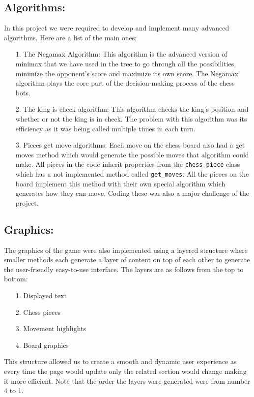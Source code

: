 \documentclass{article}
\begin{document}
\subsection*{Algorithms:}
In this project we were required to develop and implement many advanced algorithms. Here are a list of the main ones:
\begin{enumerate}
    \item[1.] The Negamax Algorithm: This algorithm is the advanced version of minimax that we have used in the tree to go through all the possibilities, minimize the opponent's score and maximize its own score. The Negamax algorithm plays the core part of the decision-making process of the chess bots.
    \item[2.] The king is check algorithm: This algorithm checks the king's position and whether or not the king is in check. The problem with this algorithm was its efficiency as it was being called multiple times in each turn.
    \item[3.] Pieces get move algorithms: Each move on the chess board also had a get moves method which would generate the possible moves that algorithm could make. All pieces in the code inherit properties from the \texttt{chess\_piece} class which has a not implemented method called \texttt{get\_moves}. All the pieces on the board implement this method with their own special algorithm which generates how they can move. Coding these was also a major challenge of the project.
\end{enumerate}

\subsection*{Graphics:}
The graphics of the game were also implemented using a layered structure where smaller methods each generate a layer of content on top of each other to generate the user-friendly easy-to-use interface. The layers are as follows from the top to bottom:
\begin{enumerate}
    \item[1.] Displayed text
    \item[2.] Chess pieces
    \item[3.] Movement highlights
    \item[4.] Board graphics
\end{enumerate}
This structure allowed us to create a smooth and dynamic user experience as every time the page would update only the related section would change making it more efficient. Note that the order the layers were generated were from number 4 to 1.
\end{document}
